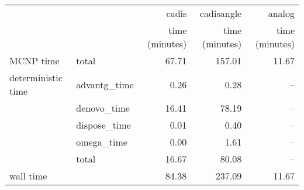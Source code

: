 \begin{tabular}{llrrr}
\toprule
          &              &          cadis &     cadisangle &         analog \\
          &              & time (minutes) & time (minutes) & time (minutes) \\
\midrule
MCNP time & total &          67.71 &         157.01 &          11.67 \\
deterministic time & advantg\_time &           0.26 &           0.28 &            -- \\
          & denovo\_time &          16.41 &          78.19 &            -- \\
          & dispose\_time &           0.01 &           0.40 &            -- \\
          & omega\_time &           0.00 &           1.61 &            -- \\
          & total &          16.67 &          80.08 &            -- \\
wall time &              &          84.38 &         237.09 &          11.67 \\
\bottomrule
\end{tabular}
